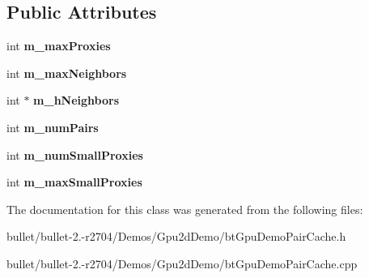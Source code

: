 \subsection*{Public Attributes}
\begin{DoxyCompactItemize}
\item 
\hypertarget{classbt_gpu_demo_pair_cache_ad388411e7fd26c4be6d9fe1bd4d0f253}{int {\bfseries m\+\_\+max\+Proxies}}\label{classbt_gpu_demo_pair_cache_ad388411e7fd26c4be6d9fe1bd4d0f253}

\item 
\hypertarget{classbt_gpu_demo_pair_cache_a1d36cea996dd0f280c34eaf16fe6b51a}{int {\bfseries m\+\_\+max\+Neighbors}}\label{classbt_gpu_demo_pair_cache_a1d36cea996dd0f280c34eaf16fe6b51a}

\item 
\hypertarget{classbt_gpu_demo_pair_cache_aa033bf58e87bdc4a83f757e3618a847d}{int $\ast$ {\bfseries m\+\_\+h\+Neighbors}}\label{classbt_gpu_demo_pair_cache_aa033bf58e87bdc4a83f757e3618a847d}

\item 
\hypertarget{classbt_gpu_demo_pair_cache_a322f4d6b1742dcbae5a4fc7e961b18a5}{int {\bfseries m\+\_\+num\+Pairs}}\label{classbt_gpu_demo_pair_cache_a322f4d6b1742dcbae5a4fc7e961b18a5}

\item 
\hypertarget{classbt_gpu_demo_pair_cache_ab02450e453c87a29955d5ac5225cc21a}{int {\bfseries m\+\_\+num\+Small\+Proxies}}\label{classbt_gpu_demo_pair_cache_ab02450e453c87a29955d5ac5225cc21a}

\item 
\hypertarget{classbt_gpu_demo_pair_cache_afbca6a132d29b66a4c0dcd94976da283}{int {\bfseries m\+\_\+max\+Small\+Proxies}}\label{classbt_gpu_demo_pair_cache_afbca6a132d29b66a4c0dcd94976da283}

\end{DoxyCompactItemize}


The documentation for this class was generated from the following files\+:\begin{DoxyCompactItemize}
\item 
bullet/bullet-\/2.-\/r2704/\+Demos/\+Gpu2d\+Demo/bt\+Gpu\+Demo\+Pair\+Cache.\+h\item 
bullet/bullet-\/2.-\/r2704/\+Demos/\+Gpu2d\+Demo/bt\+Gpu\+Demo\+Pair\+Cache.\+cpp\end{DoxyCompactItemize}
